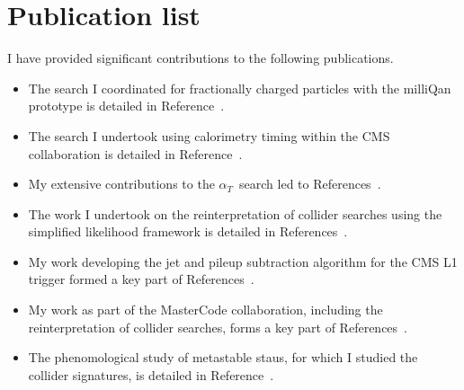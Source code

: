 \documentclass[11pt,a4paper]{article}
\theoremstyle{plain} \numberwithin{equation}{section}
\theoremstyle{definition}
\newcounter{list}
\begin{document}
\section*{Publication list}
I have provided significant contributions to the following publications.
  \begin{itemize}
  \item The search I coordinated for fractionally charged particles with the milliQan prototype is detailed in Reference~\cite{ball2020search}.
  \item The search I undertook using calorimetry timing within the CMS collaboration is detailed in Reference~\cite{2019134876}.
  \item My extensive contributions to the $\alpha_T$~search led to References~\cite{CMS:2016dbr,CMS:2015dbr}.
  \item The work I undertook on the reinterpretation of collider searches using the simplified likelihood framework is detailed in References~\cite{simplifiedLikelihood,Buckley_2019}.
  \item My work developing the jet and pileup subtraction algorithm for the CMS L1 trigger formed a key part of References~\cite{Zabi:2016ljo,Kreis:2015jjr}.
  \item My work as part of the MasterCode collaboration, including the reinterpretation of collider searches, forms a key part of References~\cite{Bagnaschi:2016afc,Bagnaschi:2015eha,Buchmueller:2014yva,Buchmueller:2012hv,deVries:2015hva,Buchmueller:2015uqa}.
  \item The phenomological study of metastable staus, for which I studied the collider signatures, is detailed in Reference~\cite{Citron:2012fg}.
  \end{itemize}

\end{document}
